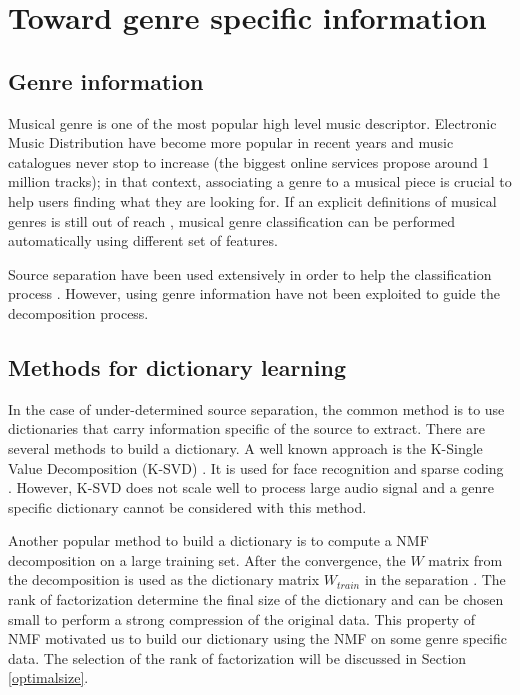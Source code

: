 \documentclass{article}
\begin{document}
\section{Toward genre specific information}\label{defgenre}

\subsection{Genre information}

Musical genre is one of the most popular high level music descriptor. Electronic Music Distribution have become more popular in recent years and music catalogues never stop to increase (the biggest online services propose around 1 million tracks); in that context, associating a genre to a musical piece is crucial to help users finding what they are looking for. If an explicit definitions of musical genres is still out of reach \cite{aucouturier2003representing}, musical genre classification can be performed automatically using different set of features\cite{tzanetakis2002musical,mckay2006musical}. 

Source separation have been used extensively in order to help the classification process \cite{rump2010autoregressive,lampropoulos2005musical}. However, using genre information have not been exploited to guide the decomposition process. 


\subsection{Methods for dictionary learning}

In the case of under-determined source separation, the common method is to use dictionaries that carry information specific of the source to extract. There are several methods to build a dictionary. A well known approach is the K-Single Value Decomposition (K-SVD) \cite{aharon2006img}. It is used for face recognition \cite{zhang2010discriminative} and sparse coding \cite{jiang2011learning}. However, K-SVD does not scale well to process large audio signal and a genre specific dictionary cannot be considered with this method.

Another popular method to build a dictionary is to compute a NMF decomposition on a large training set. After the convergence, the $W$ matrix from the decomposition is used as the dictionary matrix $W_{train}$ in the separation \cite{jaureguiberry2011adaptation}. The rank of factorization determine the final size of the dictionary and can be chosen small to perform a strong compression of the original data. This property of NMF motivated us to build our dictionary using the NMF on some genre specific data. The selection of the rank of factorization will be discussed in Section \ref{optimalsize}.  
\end{document}
